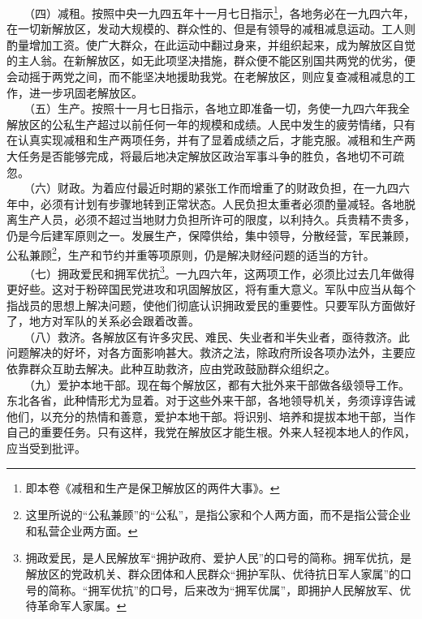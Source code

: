\documentclass[cn,11pt,chinese]{elegantbook}
\begin{document}
　　（四）减租。按照中央一九四五年十一月七日指示\footnote[3]{ 即本卷《减租和生产是保卫解放区的两件大事》。}，各地务必在一九四六年，在一切新解放区，发动大规模的、群众性的、但是有领导的减租减息运动。工人则酌量增加工资。使广大群众，在此运动中翻过身来，并组织起来，成为解放区自觉的主人翁。在新解放区，如无此项坚决措施，群众便不能区别国共两党的优劣，便会动摇于两党之间，而不能坚决地援助我党。在老解放区，则应复查减租减息的工作，进一步巩固老解放区。\\
　　（五）生产。按照十一月七日指示，各地立即准备一切，务使一九四六年我全解放区的公私生产超过以前任何一年的规模和成绩。人民中发生的疲劳情绪，只有在认真实现减租和生产两项任务，并有了显着成绩之后，才能克服。减租和生产两大任务是否能够完成，将最后地决定解放区政治军事斗争的胜负，各地切不可疏忽。\\
　　（六）财政。为着应付最近时期的紧张工作而增重了的财政负担，在一九四六年中，必须有计划有步骤地转到正常状态。人民负担太重者必须酌量减轻。各地脱离生产人员，必须不超过当地财力负担所许可的限度，以利持久。兵贵精不贵多，仍是今后建军原则之一。发展生产，保障供给，集中领导，分散经营，军民兼顾，公私兼顾\footnote[4]{ 这里所说的“公私兼顾”的“公私”，是指公家和个人两方面，而不是指公营企业和私营企业两方面。}，生产和节约并重等项原则，仍是解决财经问题的适当的方针。\\
　　（七）拥政爱民和拥军优抗\footnote[5]{ 拥政爱民，是人民解放军“拥护政府、爱护人民”的口号的简称。拥军优抗，是解放区的党政机关、群众团体和人民群众“拥护军队、优待抗日军人家属”的口号的简称。“拥军优抗”的口号，后来改为“拥军优属”，即拥护人民解放军、优待革命军人家属。}。一九四六年，这两项工作，必须比过去几年做得更好些。这对于粉碎国民党进攻和巩固解放区，将有重大意义。军队中应当从每个指战员的思想上解决问题，使他们彻底认识拥政爱民的重要性。只要军队方面做好了，地方对军队的关系必会跟着改善。\\
　　（八）救济。各解放区有许多灾民、难民、失业者和半失业者，亟待救济。此问题解决的好坏，对各方面影响甚大。救济之法，除政府所设各项办法外，主要应依靠群众互助去解决。此种互助救济，应由党政鼓励群众组织之。\\
　　（九）爱护本地干部。现在每个解放区，都有大批外来干部做各级领导工作。东北各省，此种情形尤为显着。对于这些外来干部，各地领导机关，务须谆谆告诫他们，以充分的热情和善意，爱护本地干部。将识别、培养和提拔本地干部，当作自己的重要任务。只有这样，我党在解放区才能生根。外来人轻视本地人的作风，应当受到批评。\\
\end{document}
